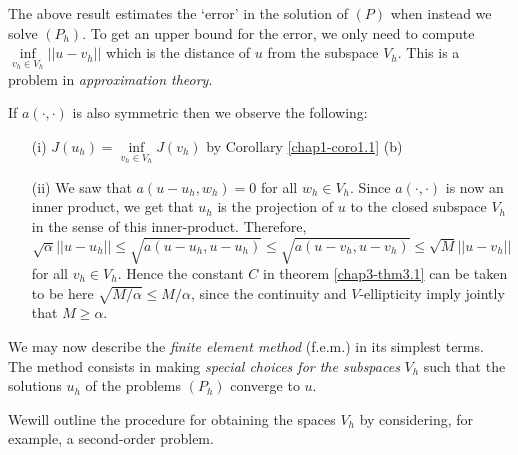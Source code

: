The above result estimates the `error' in the solution of $(P)$ when
instead we solve $(P_{h})$. To get an upper bound for the error, we
only need to compute $\inf\limits_{v_{h}\in
    V_{h}}||u-v_{h}||$ which is the distance of $u$ from the subspace
$V_{h}$. This is a problem in {\em approximation theory}.

\begin{remark}\label{chap3-rem3.1}
If $a(\cdot,\cdot)$ is also symmetric then we observe the following:
\begin{itemize}
\item[(i)] $J(u_{h})=\inf\limits_{v_{h}\in V_{h}}J(v_{h})$ by
  Corollary \ref{chap1-coro1.1} (b)

\item[(ii)] We saw that $a(u-u_{h},w_{h})=0$ for all $w_{h}\in
  V_{h}$. Since $a(\cdot,\cdot)$ is now an inner product, we get that
  $u_{h}$ is the projection of $u$ to the closed subspace $V_{h}$ in
  the sense of this inner-product. Therefore,
{\fontsize{10}{12}\selectfont
$$ 
\sqrt{\alpha}||u-u_{h}||\leq \sqrt{a(u-u_{h},u-u_{h})}\leq
\sqrt{a(u-v_{h},u-v_{h})}\leq \sqrt{M}||u-v_{h}||
$$ }
for all $v_{h}\in V_{h}$. Hence the constant $C$ in theorem
\ref{chap3-thm3.1} can be taken to be here $\sqrt{M/\alpha}\leq
M/\alpha$, since the continuity and $V$-ellipticity imply jointly that
$M\geq \alpha$.
\end{itemize}
\end{remark}

We may now describe the {\em finite element method} (f.e.m.) in its
simplest terms. The method consists in making {\em special choices for
  the subspaces} $V_{h}$ such that the solutions $u_{h}$ of the
problems $(P_{h})$ converge to $u$.

We\pageoriginale will outline the procedure for obtaining the spaces
$V_{h}$ by considering, for example, a second-order problem.

